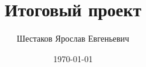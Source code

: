\documentclass[14pt,a4paper,oneside]{extreport}
\author{Шестаков Ярослав Евгеньевич}
\title{Итоговый проект}
\date{\today}
\begin{document}
    \renewcommand{\figurename}{Рисунок}
    \renewcommand{\contentsname}{Содержание}

    
    \tableofcontents

    
\end{document}
